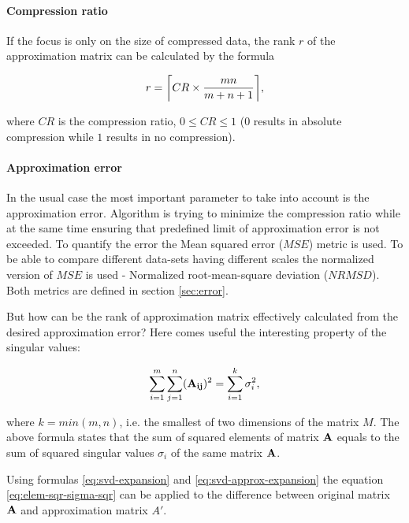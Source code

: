 \paragraph{Compression ratio}
If the focus is only on the size of compressed data, the rank $r$ of the approximation matrix can be calculated by the formula

\begin{equation}
r=\ceil*{CR \times \frac{m n}{m+n+1}},
\end{equation}

where $CR$ is the compression ratio, $0 \leq CR \leq 1$ ($0$ results in absolute compression while $1$ results in no compression).

\paragraph{Approximation error}
In the usual case the most important parameter to take into account is the approximation error. Algorithm is trying to minimize the compression ratio while at the same time ensuring that predefined limit of approximation error is not exceeded. To quantify the error the Mean squared error ($MSE$) metric is used. To be able to compare different data-sets having different scales the normalized version of $MSE$ is used - Normalized root-mean-square deviation ($NRMSD$). Both metrics are defined in section \ref{sec:error}.

But how can be the rank of approximation matrix effectively calculated from the desired approximation error? Here comes useful the interesting property of the singular values:


\begin{equation}
\sum_{i=1}^{m} \sum_{j=1}^{n} (\mathbf{A_{ij}})^{2} = \sum_{i=1}^{k}{\sigma_{i}^{2}},
\label{eq:elem-sqr-sigma-sqr}
\end{equation}

where $k=min(m, n)$, i.e. the smallest of two dimensions of the matrix $M$. The above formula states that the sum of squared elements of matrix $\mathbf{A}$ equals to the sum of squared singular values $\sigma_{i}$ of the same matrix $\mathbf{A}$.

Using formulas \eqref{eq:svd-expansion} and \eqref{eq:svd-approx-expansion} the equation \eqref{eq:elem-sqr-sigma-sqr} can be applied to the difference between original matrix $\mathbf{A}$ and approximation matrix $A'$.

